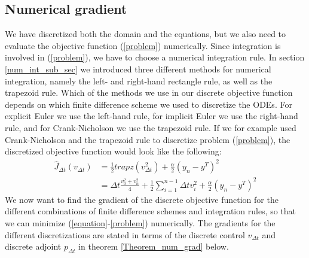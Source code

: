 \subsection{Numerical gradient}
We have discretized both the domain and the equations, but we also need to evaluate the objective function (\ref{problem}) numerically. Since integration is involved in (\ref{problem}), we have to choose a numerical integration rule. In section \ref{num_int_sub_sec} we introduced three different methods for numerical integration, namely the left- and right-hand rectangle rule, as well as the trapezoid rule. Which of the methods we use in our discrete objective function depends on which finite difference scheme we used to discretize the ODEs. For explicit Euler we use the left-hand rule, for implicit Euler we use the right-hand rule, and for Crank-Nicholson we use the trapezoid rule. If we for example used Crank-Nicholson and the trapezoid rule to discretize problem (\ref{problem}), the discretized objective function would look like the following:
\begin{align}
\hat J_{\Delta t}(v_{\Delta t})&=\frac{1}{2} trapz(v_{\Delta t}^2)+ \frac{\alpha}{2}(y_n-y^T)^2 \\
&=\Delta t\frac{v_0^2+v_n^2}{4} + \frac{1}{2}\sum_{i=1}^{n-1} \Delta t v_i^2 + \frac{\alpha}{2}(y_n-y^T)^2 \label{disc f}
\end{align}
We now want to find the gradient of the discrete objective function for the different combinations of finite difference schemes and integration rules, so that we can minimize (\ref{equation}-\ref{problem}) numerically. The gradients for the different discretizations are stated in terms of the discrete control $v_{\Delta t}$ and discrete adjoint $p_{\Delta t}$ in theorem \ref{Theorem_num_grad} below.

